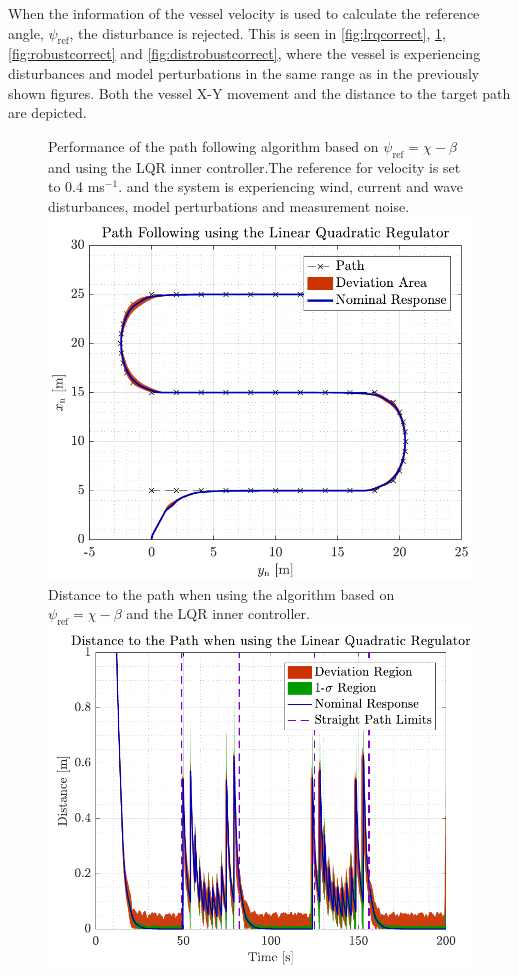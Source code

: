 When the information of the vessel velocity is used to calculate the reference angle, $\psi_\mathrm{ref}$, the disturbance is rejected. This is seen in \autoref{fig:lrqcorrect}, \ref{fig:distlqr}, \ref{fig:robustcorrect} and \ref{fig:distrobustcorrect}, where the vessel is experiencing disturbances and model perturbations in the same range as in the previously shown figures. Both the vessel X-Y movement and the distance to the target path are depicted. 

\begin{figure}[H]
	\captionbox 
	{            
		Performance of the path following algorithm based on $\psi_\mathrm{ref}=\chi-\beta$ and using the LQR inner controller.The reference for velocity is set to \num{0.4} ms$^{-1}$. and the system is experiencing wind, current and wave disturbances, model perturbations and measurement noise.                
		\label{fig:lrqcorrect}                                  
	}                                                                 
	{                                                                  
		\includegraphics[width=.45\textwidth]{figures/path_lqr}         
	}                                                                    
	\hspace{5pt}                                                          
	\captionbox 
	{       
		Distance to the path when using the algorithm based on $\psi_\mathrm{ref}=\chi-\beta$ and the LQR inner controller. \label{fig:distlqr}                                   
	}                                                     
	{                                                                        
		\includegraphics[width=.45\textwidth]{figures/dist_lqr}            
	}                                                                            
\end{figure}
